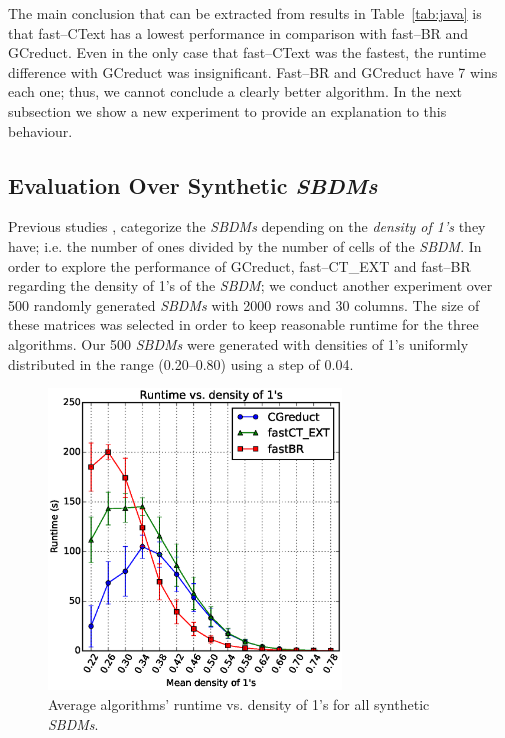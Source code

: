 \documentclass[authoryear,preprint,review,12pt]{elsarticle}
\begin{document}
    The main conclusion that can be extracted from results in Table~\ref{tab:java} is that fast--CText has a lowest performance in comparison with fast--BR and GCreduct. Even in the only case that fast--CText was the fastest, the runtime difference with GCreduct was insignificant. Fast--BR and GCreduct have 7 wins each one; thus, we cannot conclude a clearly better algorithm. In the next subsection we show a new experiment to provide an explanation to this behaviour.	
	
\subsection{Evaluation Over Synthetic \textit{SBDMs}}\label{sub:synth}

	Previous studies \citep{Rojas12,Lias13,Rodriguez15}, categorize the \textit{SBDMs} depending on the \emph{density of 1's} they have; i.e. the number of ones divided by the number of cells of the \textit{SBDM}. In order to explore the performance of GCreduct, fast--CT\_EXT and fast--BR regarding the density of 1's of the \textit{SBDM}; we conduct another experiment over 500 randomly generated \textit{SBDMs} with 2000 rows and 30 columns. The size of these matrices was selected in order to keep reasonable runtime for the three algorithms. Our 500 \textit{SBDMs} were generated with densities of 1's uniformly distributed in the range (0.20--0.80) using a step of 0.04. 
				
	\begin{figure}[htb]
		\begin{center}
			\includegraphics[height=8cm]{overal.eps}
		\end{center}
		\caption{Average algorithms' runtime vs. density of 1's for all synthetic \textit{SBDMs}.}
		\label{fig:scattDensity}
	\end{figure}	
\end{document}
